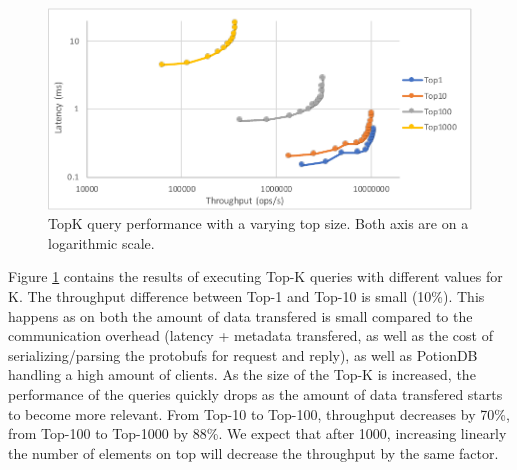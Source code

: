 \documentclass{vldb}
\newcommand{\grumbler}[2]{{\color{red}{\bf #1:} #2}}
\renewcommand{\grumbler}[2]{}
\newcommand{\andre}[1]{\grumbler{andre}{#1}}
\begin{document}
\begin{figure}
	\centering
	\includegraphics[width=.95\linewidth]{TopKTopSize0upd_cut}
	\caption{TopK query performance with a varying top size. Both axis are on a logarithmic scale.}
	\label{fig:TopkSize0upd}
\end{figure}

Figure \ref{fig:TopkSize0upd} contains the results of executing Top-K queries with different values for K.
The throughput difference between Top-1 and Top-10 is small (10\%). This happens as on both the amount of data transfered is small compared to the communication overhead (latency + metadata transfered, as well as the cost of serializing/parsing the protobufs for request and reply), as well as PotionDB handling a high amount of clients.
As the size of the Top-K is increased, the performance of the queries quickly drops as the amount of data transfered starts to become more relevant.
From Top-10 to Top-100, throughput decreases by 70\%, from Top-100 to Top-1000 by 88\%.
We expect that after 1000, increasing linearly the number of elements on top will decrease the throughput by the same factor.
\andre{Should I mention throughput numbers? The max of each is 11.3M, 10.3M, 3.1M, 0.37M ops/s.}
\andre{Is it relevant to mention the number of entries in the TopK? (10000, same as in Q15) If so, how/where do I mention that?}
\end{document}
